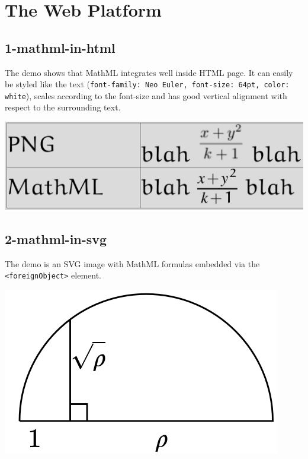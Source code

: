 \appendix

\section{The Web Platform}

\subsection{1-mathml-in-html}

The demo shows that MathML integrates well inside HTML page. It can easily be 
styled like the text ({\tt font-family: Neo Euler, font-size: 64pt, color: white}), 
scales according to the font-size and has good vertical alignment with respect 
to the surrounding text. 

\href{http://fred-wang.github.io/MathUI2014/demos/1-mathml-in-html.html}{\includegraphics[width=\textwidth]{screenshots/1-mathml-in-html}}

\subsection{2-mathml-in-svg}

The demo is an SVG image with MathML formulas embedded via the
{\tt <foreignObject>} element.

\href{http://fred-wang.github.io/MathUI2014/demos/2-mathml-in-svg.svg}{\includegraphics{screenshots/2-mathml-in-svg}}

